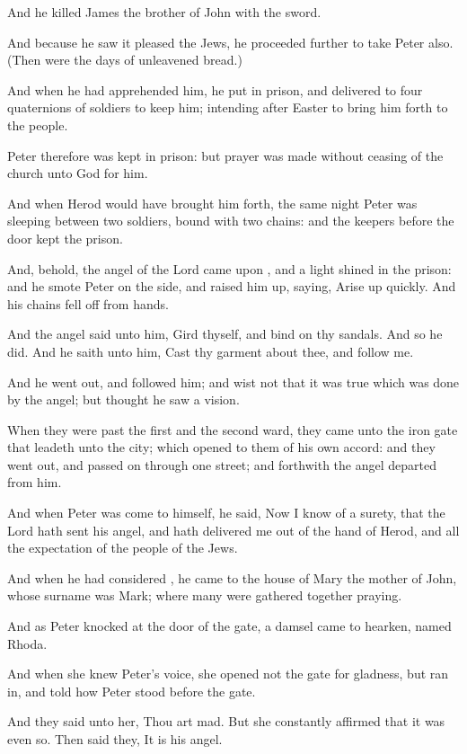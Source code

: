 {And he
killed
James the
brother of
John with the
sword.

And
because he
saw it
pleased the
Jews, he proceeded
further to
take
Peter
also. (Then
were the
days of unleavened
bread.)

And
when he had apprehended
him, he
put
{}
in
prison, and
delivered
{} to
four
quaternions of
soldiers to
keep
him;
intending
after
Easter to
bring
him
forth to the
people.

Peter
therefore was
kept
in
prison:
but
prayer
was
made without
ceasing
of the
church
unto
God
for
him.

And
when
Herod
would have
brought
him
forth, the
same
night
Peter
was
sleeping
between
two
soldiers,
bound with
two
chains:
and the
keepers
before the
door
kept the
prison.

And,
behold, the
angel of the
Lord came
upon
{},
and a
light
shined
in the
prison:
and he
smote
Peter on the
side, and
raised
him
up,
saying,
Arise
up
quickly.
And
his
chains fell
off
from
{}
hands.

And the
angel
said
unto
him, Gird
thyself,
and bind
on
thy
sandals.
And
so he
did.
And he
saith unto
him,
Cast
thy
garment about
thee,
and
follow
me.

And he went
out, and
followed
him;
and
wist
not
that it
was
true which was
done
by the
angel;
but
thought he
saw a
vision.

When they were
past the
first
and the
second
ward, they
came
unto the
iron
gate that
leadeth
unto the
city;
which
opened to
them of his own
accord:
and they went
out, and passed on
through
one
street;
and
forthwith the
angel
departed
from
him.

And
when
Peter was
come
to
himself, he
said,
Now I
know of a
surety,
that the
Lord hath
sent
his
angel,
and hath
delivered
me out
of the
hand of
Herod,
and
{}
all the
expectation of the
people of the
Jews.

And when he had
considered
{}, he
came
to the
house of
Mary the
mother of
John, whose surname
was
Mark;
where
many
were gathered
together
praying.

And
as
Peter
knocked at the
door of the
gate, a
damsel
came to
hearken,
named
Rhoda.

And when she
knew
Peter’s
voice, she
opened
not the
gate
for
gladness,
but ran
in, and
told
how
Peter
stood
before the
gate.

And they
said
unto
her, Thou art
mad.
But she constantly
affirmed that it
was even
so.
Then said
they, It
is
his
angel.

}
